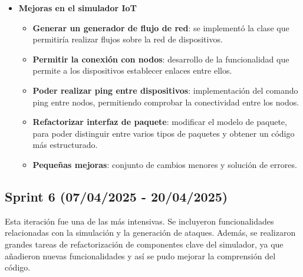 \begin{itemize}
    \item \textbf{Mejoras en el simulador IoT}
    \begin{itemize}
        \item \textbf{Generar un generador de flujo de red}: se implementó la clase que permitiría realizar flujos sobre la red de dispositivos.
        \item \textbf{Permitir la conexión con nodos}: desarrollo de la funcionalidad que permite a los dispositivos establecer enlaces entre ellos.
        \item \textbf{Poder realizar ping entre dispositivos}: implementación del comando ping entre nodos, permitiendo comprobar la conectividad entre los nodos.
        \item \textbf{Refactorizar interfaz de paquete}: modificar el modelo de paquete, para poder distinguir entre varios tipos de paquetes y obtener un código más estructurado.
        \item \textbf{Pequeñas mejoras}: conjunto de cambios menores y solución de errores.
    \end{itemize}
\end{itemize}

\subsection{Sprint 6 (07/04/2025 - 20/04/2025)}
\label{subsec:SextoSprint}
Esta iteración fue una de las más intensivas. Se incluyeron funcionalidades relacionadas con la simulación y la generación de ataques. Además, se realizaron grandes tareas de refactorización de componentes clave del simulador, ya que añadieron nuevas funcionalidades y así se pudo mejorar la comprensión del código.

